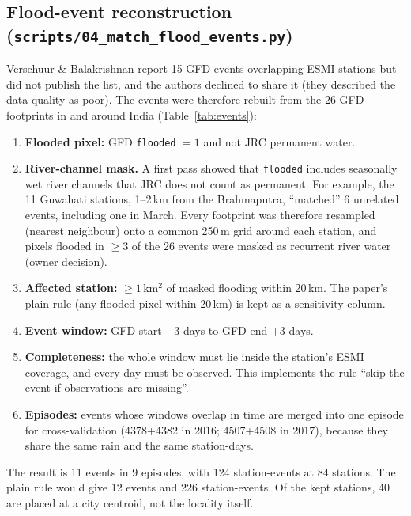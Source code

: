 \documentclass[11pt,a4paper]{article}
\newcommand{\code}[1]{\texttt{\small #1}}
\begin{document}
\subsection{Flood-event reconstruction (\code{scripts/04\_match\_flood\_events.py})}
Verschuur \& Balakrishnan report 15 GFD events overlapping ESMI stations but did not publish the list, and
the authors declined to share it (they described the data quality as poor). The events were therefore
rebuilt from the 26 GFD footprints in and around India (Table~\ref{tab:events}):
\begin{enumerate}
\item \textbf{Flooded pixel:} GFD \code{flooded} $=1$ and not JRC permanent water.
\item \textbf{River-channel mask.} A first pass showed that \code{flooded} includes seasonally wet river
channels that JRC does not count as permanent. For example, the 11 Guwahati stations, 1--2\,km from the
Brahmaputra, ``matched'' 6 unrelated events, including one in March. Every footprint was therefore resampled
(nearest neighbour) onto a common 250\,m grid around each station, and pixels flooded in $\ge 3$ of the 26
events were masked as recurrent river water (owner decision).
\item \textbf{Affected station:} $\ge 1$\,km$^2$ of masked flooding within 20\,km. The paper's plain rule
(any flooded pixel within 20\,km) is kept as a sensitivity column.
\item \textbf{Event window:} GFD start $-3$ days to GFD end $+3$ days.
\item \textbf{Completeness:} the whole window must lie inside the station's ESMI coverage, and every day must
be observed. This implements the rule ``skip the event if observations are missing''.
\item \textbf{Episodes:} events whose windows overlap in time are merged into one episode for
cross-validation (4378+4382 in 2016; 4507+4508 in 2017), because they share the same rain and the same
station-days.
\end{enumerate}
The result is 11 events in 9 episodes, with 124 station-events at 84 stations. The plain rule would give 12
events and 226 station-events. Of the kept stations, 40 are placed at a city centroid, not the locality
itself.

\begin{table}[H]\centering
\caption{All 26 GFD footprints considered. ``Affected'': stations with $\ge1$\,km$^2$ of masked flooding
within 20\,km. ``In cov.'': of those, stations whose ESMI coverage overlaps the event. ``Kept'': the window is
fully covered and completely observed. ``Kept (raw)'': the same, under the plain 20\,km rule.}\label{tab:events}
\resizebox{\textwidth}{!}{}
\end{table}
\end{document}
